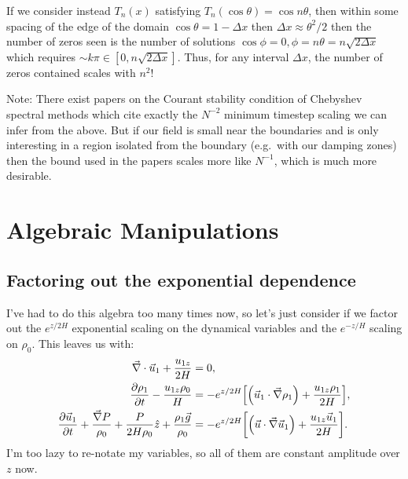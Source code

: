 \documentclass[11pt,
        usenames, %
        dvipsnames %
    ]{report}
\newcommand*{\pd}[2]{\frac{\partial#1}{\partial#2}}
\DeclarePairedDelimiter\p{\lparen}{\rparen}
\DeclarePairedDelimiter\s{\lbrack}{\rbrack}
\begin{document}
If we consider instead $T_n(x)$ satisfying $T_n(\cos \theta) = \cos n\theta$,
then within some spacing of the edge of the domain $\cos\theta = 1 - \Delta x$
then $\Delta x \approx \theta^2/2$ then the number of zeros seen is the number
of solutions $\cos \phi = 0, \phi = n\theta = n\sqrt{2\Delta x}$ which requires
$\sim k\pi \in [0, n\sqrt{2\Delta x}]$. Thus, for any interval $\Delta x$, the
number of zeros contained scales with $n^2$!

Note: There exist papers on the Courant stability condition of Chebyshev
spectral methods which cite exactly the $N^{-2}$ minimum timestep scaling we can
infer from the above. But if our field is small near the boundaries and is only
interesting in a region isolated from the boundary (e.g.\ with our damping
zones) then the bound used in the papers scales more like $N^{-1}$, which is
much more desirable.

\section{Algebraic Manipulations}

\subsection{Factoring out the exponential dependence}

I've had to do this algebra too many times now, so let's just consider if we
factor out the $e^{z/2H}$ exponential scaling on the dynamical variables and the
$e^{-z/H}$ scaling on $\rho_0$. This leaves us with:
\begin{subequations}\label{se:nonlin_factored}
    \begin{align}
        \vec{\nabla} \cdot \vec{u}_1 + \frac{u_{1z}}{2H} &= 0,\\
        \pd{\rho_1}{t} - \frac{u_{1z} \rho_0}{H} &= -e^{z/2H}\s*{
            \p*{\vec{u}_1 \cdot \vec{\nabla} \rho_1} + \frac{u_{1z}\rho_1}{2H}
        },\\
        \pd{\vec{u}_1}{t} + \frac{\vec{\nabla}P}{\rho_0}
            + \frac{P}{2H\rho_0}\hat{z} + \frac{\rho_1\vec{g}}{\rho_0}
            &= -e^{z/2H}\s*{
            \p*{\vec{u} \cdot \vec{\nabla} \vec{u}_1}
                + \frac{u_{1z}\vec{u}_1}{2H}
        }.
    \end{align}
\end{subequations}
I'm too lazy to re-notate my variables, so all of them are constant amplitude
over $z$ now.
\end{document}
